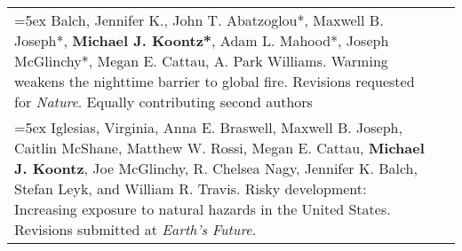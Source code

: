 \begin{longtable}{@{} >{\raggedright}p{6.25in} >{\raggedleft}X @{}}
\hangindent=5ex Balch, Jennifer K., John T. Abatzoglou*, Maxwell B. Joseph*, \textbf{Michael J. Koontz*}, Adam L. Mahood*, Joseph McGlinchy*, Megan E. Cattau, A. Park Williams. Warming weakens the nighttime barrier to global fire. Revisions requested for \emph{Nature}. 
\newline *Equally contributing second authors & \tabularnewline

\hangindent=5ex Iglesias, Virginia, Anna E. Braswell, Maxwell B. Joseph, Caitlin McShane, Matthew W. Rossi, Megan E. Cattau, \textbf{Michael J. Koontz}, Joe McGlinchy, R. Chelsea Nagy, Jennifer K. Balch, Stefan Leyk, and William R. Travis. Risky development: Increasing exposure to natural hazards in the United States. Revisions submitted at \emph{Earth's Future}. & \tabularnewline


\end{longtable}
